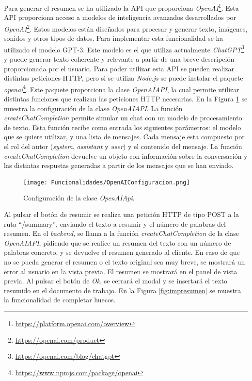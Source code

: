 Para generar el resumen se ha utilizado la API que proporciona \textit{OpenAI}\footnote{\url{https://platform.openai.com/overview}}. Esta API proporciona acceso a modelos de inteligencia avanzados desarrollados por \textit{OpenAI}\footnote{\url{https://openai.com/product}}. Estos modelos están diseñados para procesar y generar texto, imágenes, sonidos y otros tipos de datos. Para implementar esta funcionalidad se ha utilizado el modelo GPT-3. Este modelo es el que utiliza actualmente \textit{ChatGPT}\footnote{\url{https://openai.com/blog/chatgpt}} y puede generar texto coherente y relevante a partir de una breve descripción proporcionada por el usuario. Para poder utilizar esta API se pueden realizar distintas peticiones HTTP, pero si se utiliza \textit{Node.js} se puede instalar el paquete \textit{openai}\footnote{\url{https://www.npmjs.com/package/openai}}. Este paquete proporciona la clase \textit{OpenAIAPI}, la cual permite utilizar distintas funciones que realizan las peticiones HTTP necesarias. En la Figura \ref{fig:impresumenconfiguracion} se muestra la configuración de la clase \textit{OpenAIAPI}. La función \textit{createChatCompletion} permite simular un chat con un modelo de procesamiento de texto. Esta función recibe como entrada los siguientes parámetros: el modelo que se quiere utilizar, y una lista de mensajes. Cada mensaje esta compuesto por el rol del autor (\textit{system}, \textit{assistant} y \textit{user}) y el contenido del mensaje. La función \textit{createChatCompletion} devuelve un objeto con información sobre la conversación y las distintas respustas generadas a partir de los mensajes que se han enviado.

\begin{figure}[ht!]
  \centering
  \texttt{[image: Funcionalidades/OpenAIConfiguracion.png]}
  \caption{Configuración de la clase \textit{OpenAIApi}.}
  \label{fig:impresumenconfiguracion}
\end{figure}

Al pulsar el botón de resumir se realiza una petición HTTP de tipo POST a la ruta ``/summary'', enviando el texto a resumir y el número de palabras del resumen. En el \textit{backend}, se llama a la función \textit{createChatCompletion} de la clase \textit{OpenAIAPI}, pidiendo que se realice un resumen del texto con un número de palabras concreto, y se devuelve el resumen generado al cliente. En caso de que no se pueda generar el resumen o el texto original sea muy breve, se mostrará un error al usuario en la vista previa. El resumen se mostrará en el panel de vista previa. Al pulsar el botón de \textit{Ok}, se cerrará el modal y se insertará el texto resumido en el documento de trabajo. En la Figura \ref{fig:impresumen} se muestra la funcionalidad de completar huecos.

